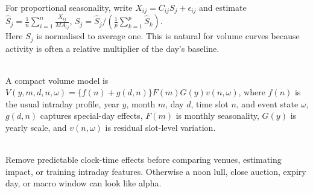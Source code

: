 \documentclass[a4paper,oneside,openany]{book}
\begin{document}
\begin{model} \\
For proportional seasonality, write $X_{ij}=C_{ij}S_j+\epsilon_{ij}$ and estimate $\hat{S}_j=\frac{1}{n}\sum\limits_{i=1}^{n}\frac{X_{ij}}{MA_{ij}}$, $S_j=\hat{S}_j / \left( \frac{1}{p}\sum\limits_{k=1}^{p}\hat{S}_k \right)$.\\
Here $S_j$ is normalised to average one. This is natural for volume curves because activity is often a relative multiplier of the day's baseline.
\end{model}

\begin{model} \\
A compact volume model is $V(y,m,d,n,\omega)=\{f(n)+g(d,n)\}F(m)G(y)v(n,\omega)$, where 
$f(n)$ is the usual intraday profile, year $y$, month $m$, day $d$, time slot $n$, and event state $\omega$, $g(d,n)$ captures special-day effects, $F(m)$ is monthly seasonality, $G(y)$ is yearly scale, and $v(n,\omega)$ is residual slot-level variation.
\end{model}

\begin{practitionernote} \\
Remove predictable clock-time effects before comparing venues, estimating impact, or training intraday features. Otherwise a noon lull, close auction, expiry day, or macro window can look like alpha.
\end{practitionernote}
\end{document}
